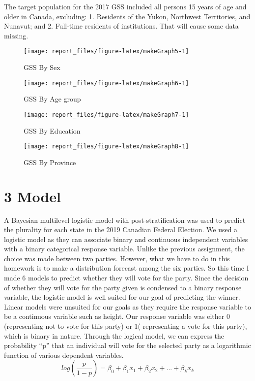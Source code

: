 \documentclass[
  12pt,
]{article}
\begin{document}
The target population for the 2017 GSS included all persons 15 years of
age and older in Canada, excluding: 1. Residents of the Yukon, Northwest
Territories, and Nunavut; and 2. Full-time residents of institutions.
That will cause some data missing.

\begin{figure}
\texttt{[image: report\_files/figure-latex/makeGraph5-1]} \caption{GSS By Sex}\label{fig:makeGraph5}
\end{figure}

\begin{figure}
\texttt{[image: report\_files/figure-latex/makeGraph6-1]} \caption{GSS By Age group}\label{fig:makeGraph6}
\end{figure}

\begin{figure}
\texttt{[image: report\_files/figure-latex/makeGraph7-1]} \caption{GSS By Education}\label{fig:makeGraph7}
\end{figure}

\begin{figure}
\texttt{[image: report\_files/figure-latex/makeGraph8-1]} \caption{GSS By Province}\label{fig:makeGraph8}
\end{figure}

\hypertarget{model}{%
\section{3 Model}\label{model}}

A Bayesian multilevel logistic model with post-stratification was used
to predict the plurality for each state in the 2019 Canadian Federal
Election. We used a logistic model as they can associate binary and
continuous independent variables with a binary categorical response
variable. Unlike the previous assignment, the choice was made between
two parties. However, what we have to do in this homework is to make a
distribution forecast among the six parties. So this time I made 6
models to predict whether they will vote for the party. Since the
decision of whether they will vote for the party given is condensed to a
binary response variable, the logistic model is well suited for our goal
of predicting the winner. Linear models were unsuited for our goals as
they require the response variable to be a continuous variable such as
height. Our response variable was either 0 (representing not to vote for
this party) or 1( representing a vote for this party), which is binary
in nature. Through the logical model, we can express the probability
``p'' that an individual will vote for the selected party as a
logarithmic function of various dependent variables.
\[log(\frac{p}{1 - p}) = \beta_0 + \beta_1x_1 + \beta_2x_2 + ... + \beta_kx_k\]
\end{document}

